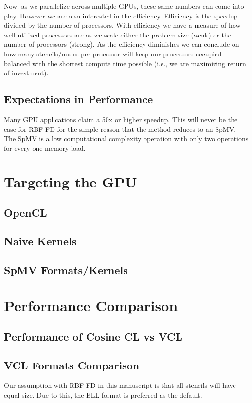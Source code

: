 \documentclass{report}
\begin{document}
Now, as we parallelize across multiple GPUs, these same numbers can come into
play. However we are also interested in the efficiency. Efficiency is the
speedup divided by the number of processors. With efficiency we have a measure
of how well-utilized processors are as we scale either the problem size (weak)
or the number of processors (strong). As the efficiency diminishes we can
conclude on how many stencils/nodes per processor will keep our processors
occupied balanced with the shortest compute time possible (i.e., we are
maximizing return of investment). 

\subsection{Expectations in Performance}
Many GPU applications claim a 50x or higher speedup. This will never be the case for RBF-FD for the simple reason that the method reduces to an SpMV. The SpMV is a low computational complexity operation with only two operations for every one memory load. 


\section{Targeting the GPU}

\subsection{OpenCL}
\subsection{Naive Kernels}
\subsection{SpMV Formats/Kernels}

\section{Performance Comparison}
\subsection{Performance of Cosine CL vs VCL}
\subsection{VCL Formats Comparison}

Our assumption with RBF-FD in this manuscript is that all stencils will have equal size. Due to this, the ELL format is preferred as the default. 
 
\end{document}
